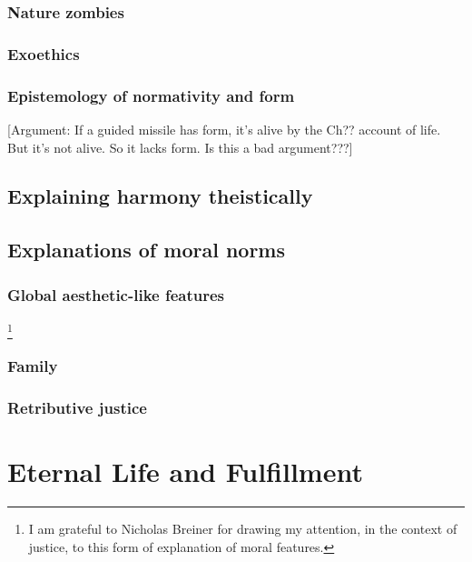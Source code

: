\subsection{Nature zombies}
\subsection{Exoethics}
\subsection{Epistemology of normativity and form}\label{ch:epist-of-form}
[Argument: If a guided missile has form, it's alive by the Ch?? account of life. But it's not alive. So it lacks form. Is this a bad argument???]
\section{Explaining harmony theistically}
\section{Explanations of moral norms}
\subsection{Global aesthetic-like features}\footnote{I am grateful to Nicholas Breiner for drawing my attention, in the context of
justice, to this form of explanation of moral features.}
\subsection{Family}
\subsection{Retributive justice}
\chaptertail

\def\mychapter{XI}

\chapter{Eternal Life and Fulfillment}\label{ch:eternal-life}
\chaptertail


